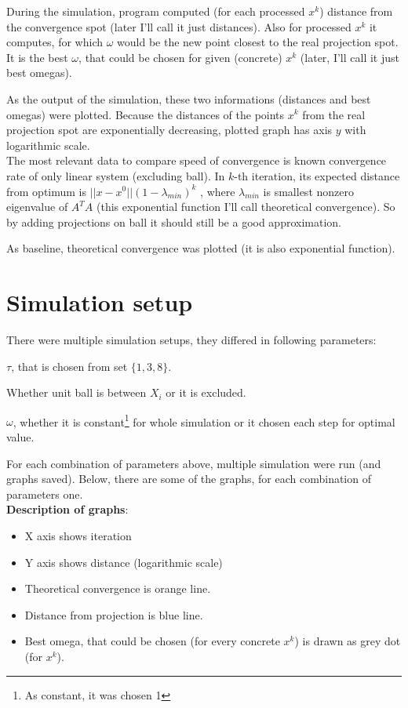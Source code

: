 \documentclass[11pt]{book}
\theoremstyle{definition}
\begin{document}
	During the simulation, program computed (for each processed $x^k$) distance from the convergence spot (later I'll call it just distances). Also for processed $x^k$ it computes, for which $\omega$ would be the new point closest to the real projection spot. It is the best $\omega$, that could be chosen for given (concrete) $x^k$ (later, I'll call it just best omegas).
	
	As the output of the simulation, these two informations (distances and best omegas) were plotted. Because the distances of the points $x^k$ from the real projection spot are exponentially decreasing, plotted graph has axis $y$ with logarithmic scale.\\
	
	The most relevant data to compare speed of convergence is known convergence rate of only linear system (excluding ball). In $k$-th iteration, its expected distance from optimum is $||x-x^0||(1-\lambda_{min})^k$ \cite{kaczmarz}, where $\lambda_{min}$ is smallest nonzero eigenvalue of $A^TA$ (this exponential function I'll call theoretical convergence). So by adding projections on ball it should still be a good approximation.
	
	As baseline, theoretical convergence was plotted (it is also exponential function).
	
	\section{Simulation setup}
	
	There were multiple simulation setups, they differed in following parameters:
	
	\begin{list}{•}{}
		\item $\tau$, that is chosen from set $\{ 1, 3, 8 \}$.
		\item Whether unit ball is between $X_i$ or it is excluded.
		\item $\omega$, whether it is constant\footnote{As constant, it was chosen 1} for whole simulation or it chosen each step for optimal value.
	\end{list}
	
	For each combination of parameters above, multiple simulation were run (and graphs saved). Below, there are some of the graphs, for each combination of parameters one.\\
	
	\newpage
	\textbf{Description of graphs}:
	\begin{itemize}[noitemsep]
		\item X axis shows iteration
		\item Y axis shows distance (logarithmic scale)
		\item Theoretical convergence is orange line.
		\item Distance from projection is blue line.
		\item Best omega, that could be chosen (for every concrete $x^k$) is drawn as grey dot (for $x^k$).
	\end{itemize}
	
\end{document}
